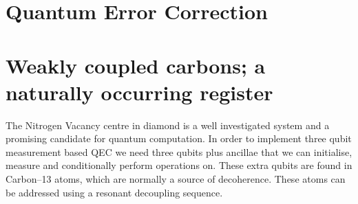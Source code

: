 


\section{Quantum Error Correction}



\section{Weakly coupled carbons; a naturally occurring register }






The Nitrogen Vacancy centre in diamond is a well investigated system\citep{Doherty2013NitrogenVacancy} and a promising candidate for quantum computation\citep{Childress2013Diamond}. In order to implement three qubit measurement based QEC we need three qubits plus ancillae that we can initialise, measure and conditionally perform operations on. These extra qubits are found in Carbon--13 atoms, which are normally a source of decoherence. These atoms can be addressed using a resonant decoupling sequence\citep{Taminiau2012Detectiona}.
